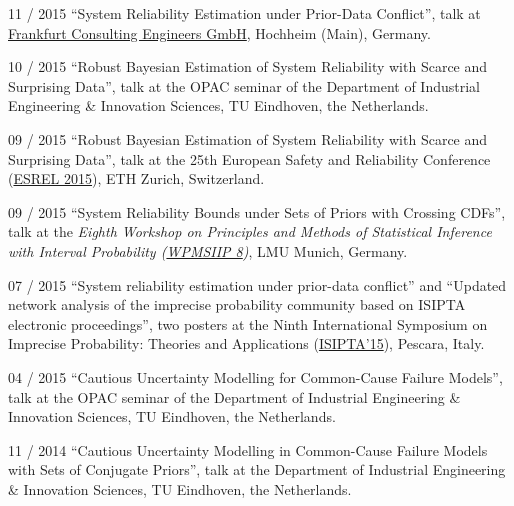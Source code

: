 \documentclass[a4paper]{simplecv}
\begin{document}
\begin{topic}
\item[11 / 2015] ``System Reliability Estimation under Prior-Data Conflict'', talk at %
                 \href{http://frankfurt-consulting.de/}{Frankfurt Consulting Engineers GmbH},
                 Hochheim (Main), Germany.

\item[10 / 2015] ``Robust Bayesian Estimation of System Reliability with Scarce and Surprising Data'', talk at
                 the OPAC seminar of
                 the Department of Industrial Engineering \& Innovation Sciences, TU Eindhoven, the Netherlands.

\item[09 / 2015] ``Robust Bayesian Estimation of System Reliability with Scarce and Surprising Data'', talk at %
                 the 25th European Safety and Reliability Conference
                 (\href{http://esrel2015.ethz.ch/}{ESREL 2015}),
                 ETH Zurich, Switzerland.

\item[09 / 2015] ``System Reliability Bounds under Sets of Priors with Crossing CDFs'', talk at the %
                 \emph{Eighth Workshop on Principles and Methods of Statistical Inference with Interval Probability (\href{http://www.statistik.lmu.de/wpmsiip_2015/index.html}{WPMSIIP 8})},
                 LMU Munich, Germany.

\item[07 / 2015] ``System reliability estimation under prior-data conflict'' and
                 ``Updated network analysis of the imprecise probability community based on ISIPTA electronic proceedings'',
                 two posters at the
                 Ninth International Symposium on Imprecise Probability: Theories and Applications
                 (\href{http://www.sipta.org/isipta15/}{ISIPTA'15}),
                 Pescara, Italy.

\item[04 / 2015] ``Cautious Uncertainty Modelling for Common-Cause Failure Models'', talk at the OPAC seminar of %
                 the Department of Industrial Engineering \& Innovation Sciences, TU Eindhoven, the Netherlands.

\item[11 / 2014] ``Cautious Uncertainty Modelling in Common-Cause Failure Models with Sets of Conjugate Priors'', talk at %
                 the Department of Industrial Engineering \& Innovation Sciences, TU Eindhoven, the Netherlands.


\end{topic}
\end{document}
